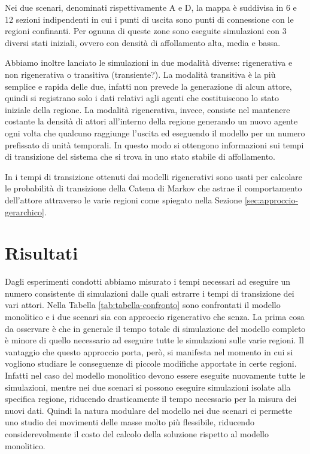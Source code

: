 Nei due scenari, denominati rispettivamente A e D, la mappa è suddivisa in 6 e 12 sezioni indipendenti in cui i punti di uscita sono punti di connessione con le regioni confinanti. Per ognuna di queste zone sono eseguite simulazioni con 3 diversi stati iniziali, ovvero con densità di affollamento alta, media e bassa. 

Abbiamo inoltre lanciato le simulazioni in due modalità diverse: rigenerativa e non rigenerativa o transitiva (transiente?). La modalità transitiva è la più semplice e rapida delle due, infatti non prevede la generazione di alcun attore, quindi si registrano solo i dati relativi agli agenti che costituiscono lo stato iniziale della regione. La modalità rigenerativa, invece, consiste nel mantenere costante la densità di attori all'interno della regione generando un nuovo agente ogni volta che qualcuno raggiunge l'uscita ed eseguendo il modello per un numero prefissato di unità temporali. In questo modo si ottengono informazioni sui tempi di transizione del sistema che si trova in uno stato stabile di affollamento.

In \cite{esperimenti-sandro} i tempi di transizione ottenuti dai modelli rigenerativi sono usati per calcolare le probabilità di transizione della Catena di Markov che astrae il comportamento dell'attore attraverso le varie regioni come spiegato nella Sezione \ref{sec:approccio-gerarchico}.



\section{Risultati}

Dagli esperimenti condotti abbiamo misurato i tempi necessari ad eseguire un numero consistente di simulazioni dalle quali estrarre i tempi di transizione dei vari attori. Nella Tabella \ref{tab:tabella-confronto} sono confrontati il modello monolitico e i due scenari sia con approccio rigenerativo che senza. La prima cosa da osservare è che in generale il tempo totale di simulazione del modello completo è minore di quello necessario ad eseguire tutte le simulazioni sulle varie regioni. Il vantaggio che questo approccio porta, però, si manifesta nel momento in cui si vogliono studiare le conseguenze di piccole modifiche apportate in certe regioni. Infatti nel caso del modello monolitico devono essere eseguite nuovamente tutte le simulazioni, mentre nei due scenari si possono eseguire simulazioni isolate alla specifica regione, riducendo drasticamente il tempo necessario per la misura dei nuovi dati. Quindi la natura modulare del modello nei due scenari ci permette uno studio dei movimenti delle masse molto più flessibile, riducendo considerevolmente il costo del calcolo della soluzione rispetto al modello monolitico.


